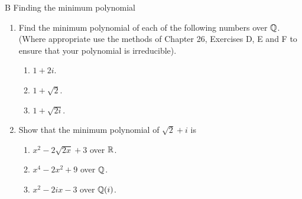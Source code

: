 \begin{exercise}{B Finding the minimum polynomial}
\begin{enumerate}
    \item Find the minimum polynomial of each of the following numbers over $\mathbb{Q}$. (Where appropriate use the methods of Chapter 26, Exercises D, E and F to ensure that your polynomial is irreducible).
    \begin{enumerate}
        \item $1+2i$.
        \item $1+\sqrt{2}$.
        \item $1+\sqrt{2i}$.
    \end{enumerate}
    \item Show that the minimum polynomial of $\sqrt{2}+i$ is
    \begin{enumerate}
        \item $x^2-2\sqrt{2x}+3$ over $\mathbb{R}$.
        \item $x^4-2x^2+9$ over $\mathbb{Q}$.
        \item $x^2-2ix-3$ over $\mathbb{Q}(i)$.
    \end{enumerate}
\end{enumerate}
\end{exercise}
